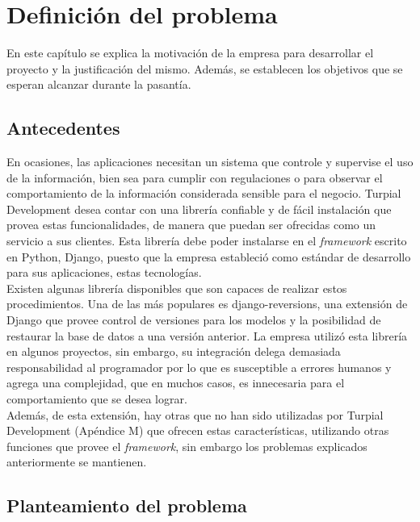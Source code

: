 \chapter{\textbf{Definición del problema}}

\thispagestyle{empty}

En este capítulo se explica la motivación de la empresa para desarrollar el
proyecto y la justificación del mismo. Además, se establecen los objetivos que
se esperan alcanzar durante la pasantía.

\section{Antecedentes}

En ocasiones, las aplicaciones necesitan un sistema que controle y supervise el uso de la información, bien sea para cumplir con regulaciones o para observar el comportamiento de la información considerada sensible para el negocio. Turpial Development desea contar con una librería confiable y de fácil instalación que provea estas funcionalidades, de manera que puedan ser ofrecidas como un servicio a sus clientes. Esta librería debe poder instalarse en el \textit{framework} escrito en Python, Django, puesto que la empresa estableció como estándar de desarrollo para sus aplicaciones, estas tecnologías. \\

Existen algunas librería disponibles que son capaces de realizar estos
procedimientos. Una de las más populares es django-reversions, una extensión de
Django que provee control de versiones para los modelos y la posibilidad de
restaurar la base de datos a una versión anterior. La empresa utilizó esta
librería en algunos proyectos, sin embargo, su integración delega demasiada
responsabilidad al programador por lo que es susceptible a errores humanos y
agrega una complejidad, que en muchos casos, es innecesaria para el
comportamiento que se desea lograr. \\

Además, de esta extensión, hay otras que no han sido utilizadas por Turpial
Development (Apéndice M) que ofrecen estas características, utilizando otras
funciones que provee el \textit{framework}, sin embargo los problemas explicados
anteriormente se mantienen.

\section{Planteamiento del problema}

